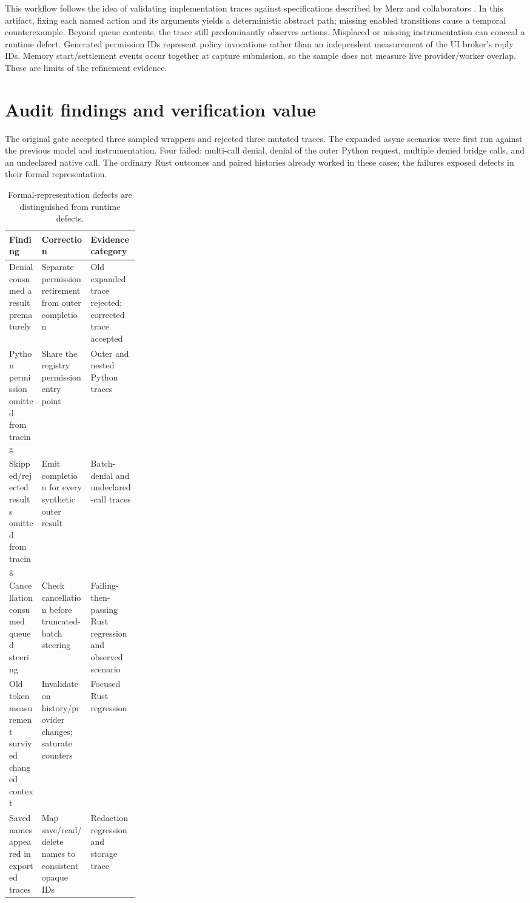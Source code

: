 \documentclass[10pt,letterpaper]{article}
\begin{document}
This workflow follows the idea of validating implementation traces against
specifications described by Merz and collaborators \cite{merz2024}. In this
artifact, fixing each named action and its arguments yields a deterministic
abstract path; missing enabled transitions cause a temporal counterexample.
Beyond queue contents, the trace still predominantly observes actions.
Misplaced or missing instrumentation can conceal a runtime
defect. Generated permission IDs represent policy invocations rather than an
independent measurement of the UI broker's reply IDs. Memory start/settlement
events occur together at capture submission, so the sample does not measure
live provider/worker overlap. These are limits of the refinement evidence.

\section{Audit findings and verification value}
The original gate accepted three sampled wrappers and rejected three mutated
traces. The expanded async scenarios were first run against the previous model
and instrumentation. Four failed: multi-call denial, denial of the outer
Python request, multiple denied bridge calls, and an undeclared native call.
The ordinary Rust outcomes and paired histories already worked in these cases;
the failures exposed defects in their formal representation.

\begin{table}[ht]
\small
\begin{tabularx}{\linewidth}{@{}p{0.25\linewidth}YY@{}}
\toprule
Finding & Correction & Evidence category \\
\midrule
Denial consumed a result prematurely & Separate permission retirement from outer completion & Old expanded trace rejected; corrected trace accepted \\
Python permission omitted from tracing & Share the registry permission entry point & Outer and nested Python traces \\
Skipped/rejected results omitted from tracing & Emit completion for every synthetic outer result & Batch-denial and undeclared-call traces \\
Cancellation consumed queued steering & Check cancellation before truncated-batch steering & Failing-then-passing Rust regression and observed scenario \\
Old token measurement survived changed context & Invalidate on history/provider changes; saturate counters & Focused Rust regression \\
Saved names appeared in exported traces & Map save/read/delete names to consistent opaque IDs & Redaction regression and storage trace \\
\bottomrule
\end{tabularx}
\caption{Formal-representation defects are distinguished from runtime defects.}
\end{table}
\end{document}

